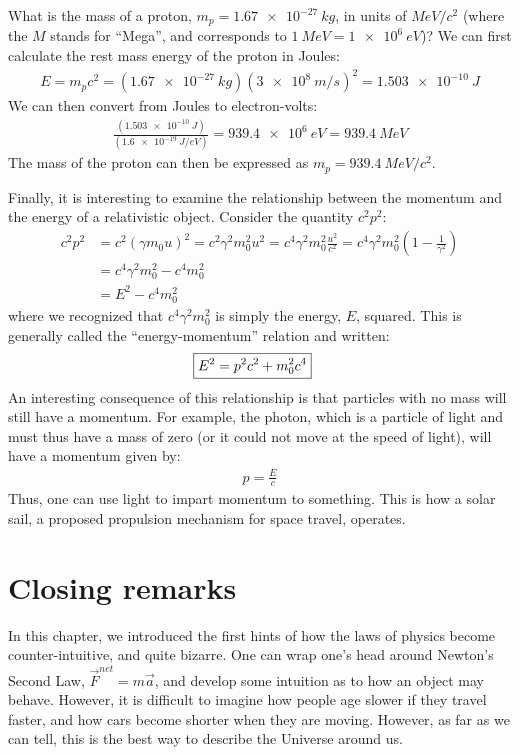 \begin{example}{What is the mass of a proton, $m_p=\SI{1.67e-27}{kg}$, in units of $\si{MeV/c^2}$ (where the $M$ stands for ``Mega'', and corresponds to $\SI{1}{MeV}=\SI{1e6}{eV}$)?}
We can first calculate the rest mass energy of the proton in Joules:
\begin{align*}
E=m_pc^2=(\SI{1.67e-27}{kg})(\SI{3e8}{m/s})^2=\SI{1.503e-10}{J}
\end{align*}
We can then convert from Joules to electron-volts:
\begin{align*}
\frac{(\SI{1.503e-10}{J})}{(\SI{1.6e-19}{J/eV})}=\SI{939.4e6}{eV}=\SI{939.4}{MeV}
\end{align*}
The mass of the proton can then be expressed as $m_p=\SI{939.4}{MeV/c^2}$.
\end{example}

Finally, it is interesting to examine the relationship between the momentum and the energy of a relativistic object. Consider the quantity $c^2p^2$:
\begin{align*}
c^2p^2 &= c^2(\gamma m_0 u)^2=c^2\gamma^2m_0^2u^2=c^4\gamma^2m_0^2\frac{u^2}{c^2}=c^4\gamma^2m_0^2\left(1- \frac{1}{\gamma^2}\right)\\
&=c^4\gamma^2m_0^2 - c^4m_0^2\\
&=E^2-c^4m_0^2
\end{align*}
where we recognized that $c^4\gamma^2m_0^2$ is simply the energy, $E$, squared. This is generally called the ``energy-momentum'' relation and written:
\begin{align*}
\Aboxed{E^2=p^2c^2+m_0^2c^4}
\end{align*}
An interesting consequence of this relationship is that particles with no mass will still have a momentum. For example, the photon, which is a particle of light and must thus have a mass of zero (or it could not move at the speed of light), will have a momentum given by:
\begin{align*}
p=\frac{E}{c}
\end{align*}
Thus, one can use light to impart momentum to something. This is how a solar sail, a proposed propulsion mechanism for space travel, operates.

\section{Closing remarks}
In this chapter, we introduced the first hints of how the laws of physics become counter-intuitive, and quite bizarre. One can wrap one's head around Newton's Second Law, $\vec F^{net}=m\vec a$, and develop some intuition as to how an object may behave. However, it is difficult to imagine how people age slower if they travel faster, and how cars become shorter when they are moving. However, as far as we can tell, this is the best way to describe the Universe around us. 

